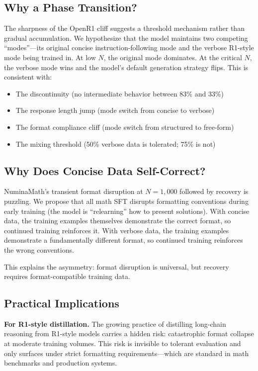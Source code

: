 \documentclass{article}
\begin{document}
\subsection{Why a Phase Transition?}

The sharpness of the OpenR1 cliff suggests a threshold mechanism rather than gradual accumulation. We hypothesize that the model maintains two competing ``modes''---its original concise instruction-following mode and the verbose R1-style mode being trained in. At low $N$, the original mode dominates. At the critical $N$, the verbose mode wins and the model's default generation strategy flips. This is consistent with:

\begin{itemize}
    \item The discontinuity (no intermediate behavior between 83\% and 33\%)
    \item The response length jump (mode switch from concise to verbose)
    \item The format compliance cliff (mode switch from structured to free-form)
    \item The mixing threshold (50\% verbose data is tolerated; 75\% is not)
\end{itemize}

\subsection{Why Does Concise Data Self-Correct?}

NuminaMath's transient format disruption at $N{=}1{,}000$ followed by recovery is puzzling. We propose that all math SFT disrupts formatting conventions during early training (the model is ``relearning'' how to present solutions). With concise data, the training examples themselves demonstrate the correct format, so continued training reinforces it. With verbose data, the training examples demonstrate a fundamentally different format, so continued training reinforces the wrong conventions.

This explains the asymmetry: format disruption is universal, but recovery requires format-compatible training data.

\subsection{Practical Implications}

\textbf{For R1-style distillation.} The growing practice of distilling long-chain reasoning from R1-style models carries a hidden risk: catastrophic format collapse at moderate training volumes. This risk is invisible to tolerant evaluation and only surfaces under strict formatting requirements---which are standard in math benchmarks and production systems.
\end{document}
